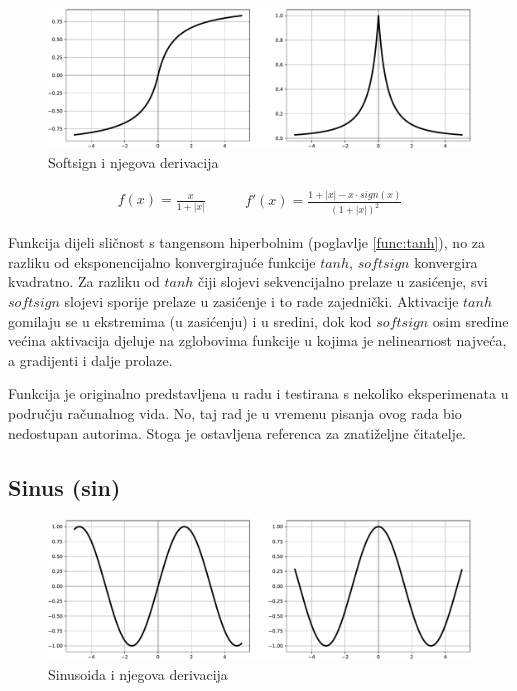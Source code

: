 \documentclass[times, utf8, numeric, diplomski]{fer}
\def\secref#1{(poglavlje \ref{#1})}
\begin{document}
\begin{figure}[H]
\includegraphics[width=\textwidth]{func_Softsign.pdf}
\centering
\caption{Softsign i njegova derivacija}
\label{fig:softsign}
\end{figure}

\begin{equation}
\label{eq:softsign}
\begin{split}
f(x) = \frac{x}{1+|x|}
\end{split}
\qquad
\begin{split}
f'(x) = \frac{1 + |x| - x \cdot sign(x)}{(1+|x|)^2}
\end{split}
\end{equation}

Funkcija dijeli sličnost s tangensom hiperbolnim \secref{func:tanh}, no za razliku od eksponencijalno konvergirajuće funkcije $tanh$, $softsign$ konvergira kvadratno. Za razliku od $tanh$ čiji slojevi sekvencijalno prelaze u zasićenje, svi $softsign$ slojevi sporije prelaze u zasićenje i to rade zajednički. Aktivacije $tanh$ gomilaju se u ekstremima (u zasićenju) i u sredini, dok kod $softsign$ osim sredine većina aktivacija djeluje na zglobovima funkcije u kojima je nelinearnost najveća, a gradijenti i dalje prolaze. \citep{xavier}

Funkcija je originalno predstavljena u radu \citet{softsign_orig} i testirana s nekoliko eksperimenata u području računalnog vida. No, taj rad je u vremenu pisanja ovog rada bio nedostupan autorima. Stoga je ostavljena referenca za znatiželjne čitatelje.

\subsection{Sinus (sin)}

\begin{figure}[H]
\includegraphics[width=\textwidth]{func_Sin.pdf}
\centering
\caption{Sinusoida i njegova derivacija}
\label{fig:sin}
\end{figure}
\end{document}
